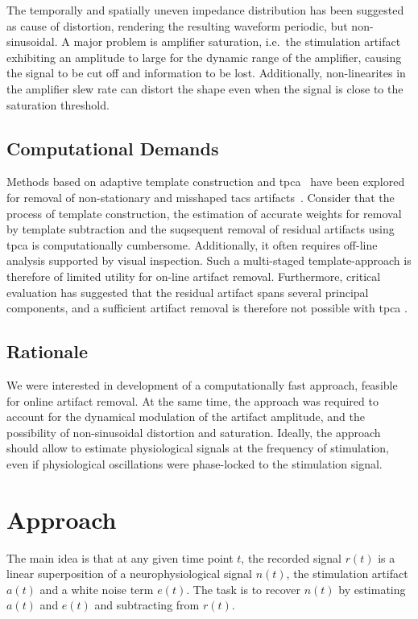 \documentclass[a4paper]{article}
\begin{document}
The temporally and spatially uneven impedance distribution has been suggested as cause of distortion, rendering the resulting waveform periodic, but non-sinusoidal. A major problem is amplifier saturation, i.e.\ the stimulation artifact exhibiting an amplitude to large for the dynamic range of the amplifier, causing the signal to be cut off and information to be lost. Additionally, non-linearites in the amplifier slew rate can distort the shape even when the signal is close to the saturation threshold.

\subsection{Computational Demands}

Methods based on adaptive template construction and \gls{tpca}~\citep{Niazy_2005} have been explored for removal of  non-stationary and misshaped \gls{tacs} artifacts~\citep{Helfrich_2014}.  Consider that the process of template construction, the estimation of accurate weights for removal by template subtraction and the suqsequent removal of residual artifacts using \gls{tpca} is computationally cumbersome. Additionally, it often requires off-line analysis supported by visual inspection.
Such a multi-staged template-approach is therefore of limited utility for on-line artifact removal. Furthermore, critical evaluation has suggested that the residual artifact spans several principal components, and a sufficient artifact removal is therefore not possible with \gls{tpca} \citep{Noury_2016}.

\subsection{Rationale}

We were interested in development of a computationally fast approach, feasible for online artifact removal. At the same time, the approach was required to account for the dynamical modulation of the artifact amplitude, and the possibility of non-sinusoidal distortion and saturation. Ideally, the approach should allow to estimate physiological signals at the frequency of stimulation, even if physiological oscillations were phase-locked to the stimulation signal.

\section{Approach}

The main idea is that at any given time point $t$, the recorded signal $r(t)$ is a linear super\-position of a neurophysiological signal $n(t)$, the stimulation artifact $a(t)$ and a white noise term $e(t)$. The task is to recover $n(t)$ by estimating $a(t)$ and $e(t)$ and subtracting from $r(t)$.
\end{document}
